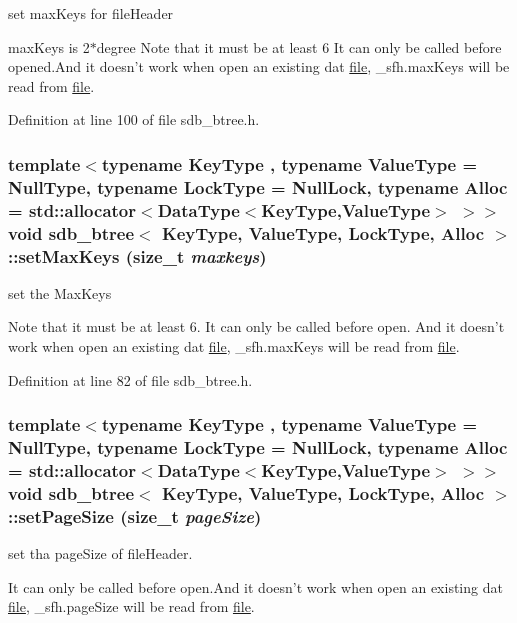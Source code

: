 set maxKeys for fileHeader 

maxKeys is 2$\ast$degree Note that it must be at least 6 It can only be called before opened.And it doesn't work when open an existing dat \hyperlink{classfile}{file}, \_\-sfh.maxKeys will be read from \hyperlink{classfile}{file}. 

Definition at line 100 of file sdb\_\-btree.h.\hypertarget{classsdb__btree_c393399c9c8b9a1f06ecb4f4cce15bf0}{
\subsubsection[{setMaxKeys}]{\setlength{\rightskip}{0pt plus 5cm}template$<$typename KeyType , typename ValueType  = NullType, typename LockType  = NullLock, typename Alloc  = std::allocator$<$DataType$<$KeyType,ValueType$>$ $>$$>$ void {\bf sdb\_\-btree}$<$ KeyType, ValueType, LockType, Alloc $>$::setMaxKeys (size\_\-t {\em maxkeys})}}
\label{classsdb__btree_c393399c9c8b9a1f06ecb4f4cce15bf0}


set the MaxKeys 

Note that it must be at least 6. It can only be called before open. And it doesn't work when open an existing dat \hyperlink{classfile}{file}, \_\-sfh.maxKeys will be read from \hyperlink{classfile}{file}. 

Definition at line 82 of file sdb\_\-btree.h.\hypertarget{classsdb__btree_930cde276bf7ed268a7005ba92dfbf12}{
\subsubsection[{setPageSize}]{\setlength{\rightskip}{0pt plus 5cm}template$<$typename KeyType , typename ValueType  = NullType, typename LockType  = NullLock, typename Alloc  = std::allocator$<$DataType$<$KeyType,ValueType$>$ $>$$>$ void {\bf sdb\_\-btree}$<$ KeyType, ValueType, LockType, Alloc $>$::setPageSize (size\_\-t {\em pageSize})}}
\label{classsdb__btree_930cde276bf7ed268a7005ba92dfbf12}


set tha pageSize of fileHeader. 

It can only be called before open.And it doesn't work when open an existing dat \hyperlink{classfile}{file}, \_\-sfh.pageSize will be read from \hyperlink{classfile}{file}.


